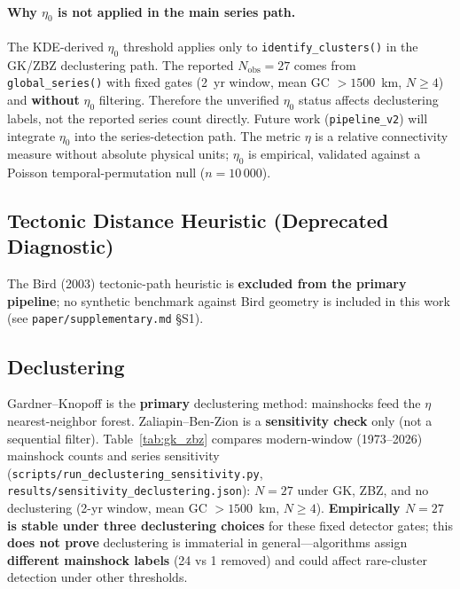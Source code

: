 \documentclass[draft]{agujournal2019}
\begin{document}
\paragraph{Why $\eta_0$ is not applied in the main series path.}
The KDE-derived $\eta_0$ threshold applies only to \texttt{identify\_clusters()}
in the GK/ZBZ declustering path. The reported $N_\mathrm{obs}=27$ comes from
\texttt{global\_series()} with fixed gates (2~yr window, mean GC $>1500$~km,
$N\ge 4$) and \textbf{without} $\eta_0$ filtering. Therefore the unverified
$\eta_0$ status affects declustering labels, not the reported series count
directly. Future work (\texttt{pipeline\_v2}) will integrate $\eta_0$ into the
series-detection path.
The metric $\eta$ is a relative connectivity measure without absolute
physical units; $\eta_0$ is empirical, validated against a Poisson
temporal-permutation null ($n = 10\,000$).

\subsection{Tectonic Distance Heuristic (Deprecated Diagnostic)}
\label{subsec:tectonic-deprecated}

\noindent The Bird (2003) tectonic-path heuristic is \textbf{excluded from the
primary pipeline}; no synthetic benchmark against Bird geometry is included in
this work (see \texttt{paper/supplementary.md} \S S1).

\subsection{Declustering}
\label{subsec:declustering}

Gardner--Knopoff \citep{Gardner1974} is the \textbf{primary} declustering
method: mainshocks feed the $\eta$ nearest-neighbor forest.
Zaliapin--Ben-Zion \citep{ZaliapinBenZion2013,ZaliapinBenZion2016} is a
\textbf{sensitivity check} only (not a sequential filter).
Table~\ref{tab:gk_zbz} compares modern-window (1973--2026) mainshock counts
and series sensitivity (\texttt{scripts/run\_declustering\_sensitivity.py},
\texttt{results/sensitivity\_declustering.json}): $N = 27$ under GK, ZBZ,
and no declustering (2-yr window, mean GC $> 1500$~km, $N \ge 4$).
\textbf{Empirically $N=27$ is stable under three declustering choices} for
these fixed detector gates; this \textbf{does not prove} declustering is
immaterial in general---algorithms assign \textbf{different mainshock labels}
(24 vs 1 removed) and could affect rare-cluster detection under other
thresholds.
\end{document}
